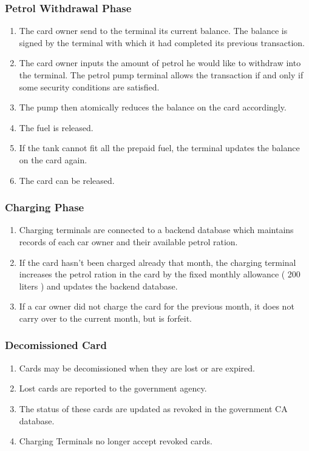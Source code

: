 \subsubsection{Petrol Withdrawal Phase}

\begin{enumerate}
  \item The card owner send to the terminal its current balance. The balance is signed by the terminal with which it had completed its previous transaction.
  \item The card owner inputs the amount of petrol he would like to withdraw into the terminal. The petrol pump terminal allows the transaction if and only if some security conditions are satisfied.
  \item The pump then atomically reduces the balance on the card accordingly.
  \item The fuel is released.
  \item If the tank cannot fit all the prepaid fuel, the terminal updates the balance on the card again.
  \item The card can be released.
\end{enumerate}


\subsubsection{Charging Phase}

\begin{enumerate}
  \item Charging terminals are connected to a backend database which maintains records of each car owner and their available petrol ration.
  \item If the card hasn't been charged already that month, the charging terminal increases the petrol ration in the card by the fixed monthly allowance ( 200 liters ) and updates the backend database. 
  \item If a car owner did not charge the card for the previous month, it does not carry over to the current month, but is forfeit.
\end{enumerate}


\subsubsection{Decomissioned Card}

\begin{enumerate}
  \item Cards may be decomissioned when they are lost or are expired.
  \item Lost cards are reported to the government agency.
  \item The status of these cards are updated as revoked in the government CA database.
  \item Charging Terminals no longer accept revoked cards.
\end{enumerate}
